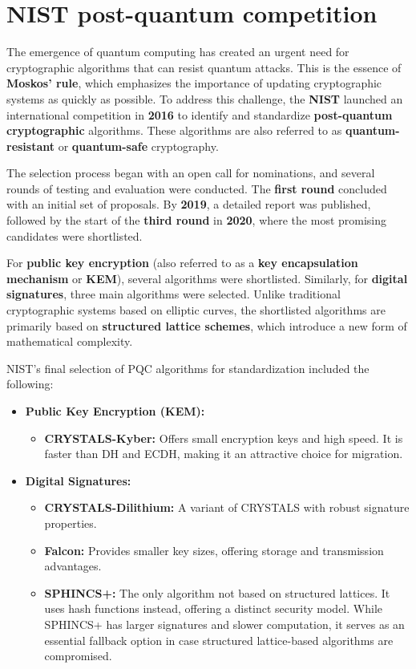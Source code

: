 \section{NIST post-quantum competition}
The emergence of quantum computing has created an urgent need for
cryptographic algorithms that can resist quantum attacks. This is the
essence of \textbf{Moskos' rule}, which emphasizes the importance of
updating cryptographic systems as quickly as possible. To address this
challenge, the \textbf{NIST} launched an international competition in
\textbf{2016} to identify and standardize \textbf{post-quantum
cryptographic} algorithms. These algorithms are also referred to
as \textbf{quantum-resistant} or \textbf{quantum-safe} cryptography.

The selection process began with an open call for nominations, and
several rounds of testing and evaluation were conducted. The
\textbf{first round} concluded with an initial set of proposals. By
\textbf{2019}, a detailed report was published, followed by the start
of the \textbf{third round} in \textbf{2020}, where the most promising
candidates were shortlisted.

For \textbf{public key encryption} (also referred to as a \textbf{key
encapsulation mechanism} or \textbf{KEM}), several algorithms were
shortlisted. Similarly, for \textbf{digital signatures}, three main
algorithms were selected. Unlike traditional cryptographic systems
based on elliptic curves, the shortlisted algorithms are primarily
based on \textbf{structured lattice schemes}, which introduce a new
form of mathematical complexity.

NIST's final selection of PQC algorithms for standardization included
the following:
\begin{itemize}
  \item \textbf{Public Key Encryption (KEM):} 
    \begin{itemize}
      \item \textbf{CRYSTALS-Kyber:} Offers small encryption keys and
        high speed. It is faster than DH and ECDH, making it an
        attractive choice for migration.
    \end{itemize}
  \item \textbf{Digital Signatures:} 
    \begin{itemize}
      \item \textbf{CRYSTALS-Dilithium:} A variant of CRYSTALS with
        robust signature properties.
      \item \textbf{Falcon:} Provides smaller key sizes, offering
        storage and transmission advantages.
      \item \textbf{SPHINCS+:} The only algorithm not based on
        structured lattices. It uses hash functions instead, offering
        a distinct security model. While SPHINCS+ has larger
        signatures and slower computation, it serves as an essential
        fallback option in case structured lattice-based algorithms
        are compromised.
    \end{itemize}
\end{itemize}

